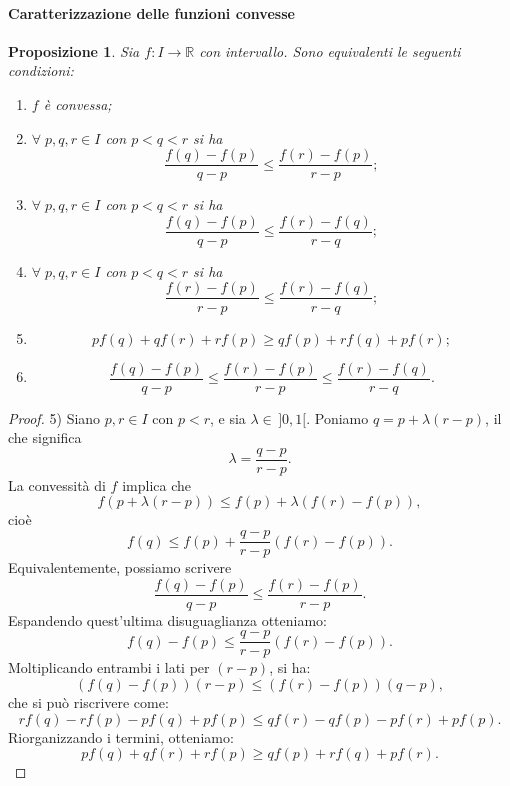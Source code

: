 \documentclass{article}
\theoremstyle{plain}
\newtheorem{prop}[thm]{Proposizione}
\theoremstyle{definition}
\theoremstyle{remark}
\begin{document}
\vspace{10pt}

\paragraph{Caratterizzazione delle funzioni convesse}
\begin{bxthm}
\begin{prop}
    Sia $f:I\to\mathbb{R}$ con intervallo. Sono equivalenti le seguenti condizioni:
    \begin{enumerate}
        \item $f$ è convessa;
        \item $\forall\;p,q,r\in I$ con $p<q<r$ si ha \[\dfrac{f(q)-f(p)}{q-p}\leq\dfrac{f(r)-f(p)}{r-p};\]
        \item $\forall\;p,q,r\in I$ con $p<q<r$ si ha \[\dfrac{f(q)-f(p)}{q-p}\leq\dfrac{f(r)-f(q)}{r-q};\]
        \item $\forall\;p,q,r\in I$ con $p<q<r$ si ha \[\dfrac{f(r)-f(p)}{r-p}\leq\dfrac{f(r)-f(q)}{r-q};\]
        \item \[pf(q)+qf(r)+rf(p)\geq qf(p)+rf(q)+pf(r);\]
        \item \[\dfrac{f(q)-f(p)}{q-p}\leq\dfrac{f(r)-f(p)}{r-p}\leq\dfrac{f(r)-f(q)}{r-q}.\]
    \end{enumerate}
\end{prop}
\end{bxthm}
\begin{proof}
    5) Siano \( p, r \in I \) con \( p < r \), e sia \(\lambda \in\,]0,1[\). 
    Poniamo \( q = p + \lambda(r - p) \), il che significa 
    \[ 
    \lambda = \dfrac{q - p}{r - p}. 
    \]
    La convessità di \( f \) implica che 
    \[ 
    f(p + \lambda(r - p)) \leq f(p) + \lambda(f(r) - f(p)), 
    \]
    cioè 
    \[ 
    f(q) \leq f(p) + \dfrac{q - p}{r - p}(f(r) - f(p)). 
    \]
    Equivalentemente, possiamo scrivere 
    \[
    \dfrac{f(q) - f(p)}{q - p} \leq \dfrac{f(r) - f(p)}{r - p}.
    \]
    Espandendo quest'ultima disuguaglianza otteniamo:
    \[
    f(q) - f(p) \leq \dfrac{q - p}{r - p}(f(r) - f(p)).
    \]
    Moltiplicando entrambi i lati per \( (r - p) \), si ha:
    \[
    (f(q) - f(p))(r - p) \leq (f(r) - f(p))(q - p),
    \]
    che si può riscrivere come:
    \[
    rf(q) - rf(p) - pf(q) + pf(p) \leq qf(r) - qf(p) - pf(r) + pf(p).
    \]
    Riorganizzando i termini, otteniamo:
    \[
    pf(q) + qf(r) + rf(p) \geq qf(p) + rf(q) + pf(r).
    \]
\end{proof}
\end{document}
